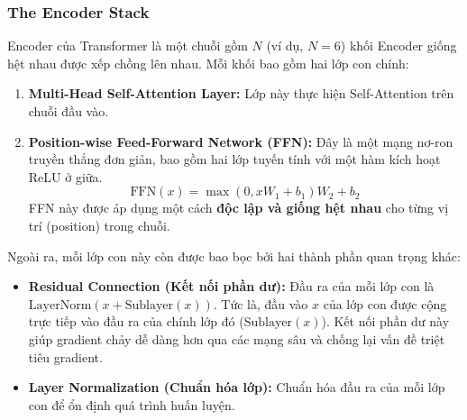 \subsubsection{The Encoder Stack}
Encoder của Transformer là một chuỗi gồm $N$ (ví dụ, $N=6$) khối Encoder giống hệt nhau được xếp chồng lên nhau. Mỗi khối bao gồm hai lớp con chính:
\begin{enumerate}
    \item \textbf{Multi-Head Self-Attention Layer:} Lớp này thực hiện Self-Attention trên chuỗi đầu vào.
    \item \textbf{Position-wise Feed-Forward Network (FFN):} Đây là một mạng nơ-ron truyền thẳng đơn giản, bao gồm hai lớp tuyến tính với một hàm kích hoạt ReLU ở giữa.
        $$ \text{FFN}(x) = \max(0, xW_1 + b_1)W_2 + b_2 $$
        FFN này được áp dụng một cách \textbf{độc lập và giống hệt nhau} cho từng vị trí (position) trong chuỗi.
\end{enumerate}
Ngoài ra, mỗi lớp con này còn được bao bọc bởi hai thành phần quan trọng khác:
\begin{itemize}
    \item \textbf{Residual Connection (Kết nối phần dư):} Đầu ra của mỗi lớp con là $\text{LayerNorm}(x + \text{Sublayer}(x))$. Tức là, đầu vào $x$ của lớp con được cộng trực tiếp vào đầu ra của chính lớp đó ($\text{Sublayer}(x)$). Kết nối phần dư này giúp gradient chảy dễ dàng hơn qua các mạng sâu và chống lại vấn đề triệt tiêu gradient.
    \item \textbf{Layer Normalization (Chuẩn hóa lớp):} Chuẩn hóa đầu ra của mỗi lớp con để ổn định quá trình huấn luyện.
\end{itemize}
